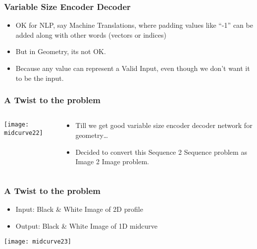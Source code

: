 \begin{frame}[fragile]\frametitle{Variable Size Encoder Decoder}

	\begin{itemize}
	\item OK for NLP, say Machine Translations, where padding values like ``-1'' can be added along with other words (vectors or indices)
	\item But in Geometry, its not OK. 
	\item Because any value can represent a Valid Input, even though we don’t want it to be the input.
	\end{itemize}
	
\end{frame}

\begin{frame}[fragile]\frametitle{A Twist to the problem}

  \begin{columns}[t]
    \begin{column}[T]{0.4\linewidth}
      \centering
      \texttt{[image: midcurve22]}
    \end{column}
    \begin{column}[T]{0.6\linewidth}
	\begin{itemize}
	\item Till we get good variable size encoder decoder network for geometry…
	\item Decided to convert this Sequence 2 Sequence problem as Image 2 Image problem.
	\end{itemize}
    \end{column}
  \end{columns}
  \end{frame}
  
\begin{frame}[fragile]\frametitle{A Twist to the problem}

	\begin{itemize}
	\item Input: Black \& White Image of 2D profile
	\item Output: Black \& White Image of 1D midcurve
	\end{itemize}
\begin{center}
\texttt{[image: midcurve23]}
\end{center}	
\end{frame}

